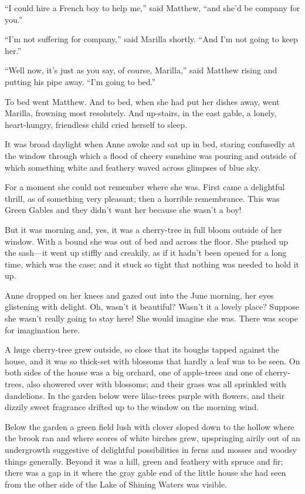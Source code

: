 \documentclass[a4paper]{article}
\begin{document}
``I could hire a French boy to help me,'' said Matthew, ``and she'd be company for you.''

\scriptsize{``I'm not suffering for company,'' said Marilla shortly. ``And I'm not going to keep her.''}

``Well now, it's just as you say, of course, Marilla,'' said Matthew rising and putting his pipe away. ``I'm going to bed.''

To bed went Matthew. And to bed, when she had put her dishes away, went Marilla, frowning most resolutely. And up-stairs, in the east gable, a lonely, heart-hungry, friendless child cried herself to sleep.

\footnotesize{It was broad daylight when Anne awoke and sat up in bed, staring confusedly at the window through which a flood of cheery sunshine was pouring and outside of which something white and feathery waved across glimpses of blue sky.}

For a moment she could not remember where she was. First came a delightful thrill, as of something very pleasant; then a horrible remembrance. This was Green Gables and they didn't want her because she wasn't a boy!

But it was morning and, yes, it was a cherry-tree in full bloom outside of her window. With a bound she was out of bed and across the floor. She pushed up the sash---it went up stiffly and creakily, as if it hadn't been opened for a long time, which was the case; and it stuck so tight that nothing was needed to hold it up.

\small{Anne dropped on her knees and gazed out into the June morning, her eyes glistening with delight. Oh, wasn't it beautiful? Wasn't it a lovely place? Suppose she wasn't really going to stay here! She would imagine she was. There was scope for imagination here.}

A huge cherry-tree grew outside, so close that its boughs tapped against the house, and it was so thick-set with blossoms that hardly a leaf was to be seen. On both sides of the house was a big orchard, one of apple-trees and one of cherry-trees, also showered over with blossoms; and their grass was all sprinkled with dandelions. In the garden below were lilac-trees purple with flowers, and their dizzily sweet fragrance drifted up to the window on the morning wind.

Below the garden a green field lush with clover sloped down to the hollow where the brook ran and where scores of white birches grew, upspringing airily out of an undergrowth suggestive of delightful possibilities in ferns and mosses and woodsy things generally. Beyond it was a hill, green and feathery with spruce and fir; there was a gap in it where the gray gable end of the little house she had seen from the other side of the Lake of Shining Waters was visible.
\end{document}
